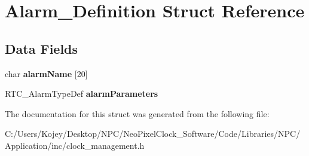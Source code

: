 \hypertarget{struct_alarm___definition}{}\section{Alarm\+\_\+\+Definition Struct Reference}
\label{struct_alarm___definition}
\subsection*{Data Fields}
\begin{DoxyCompactItemize}
\item 
\mbox{\label{struct_alarm___definition_a910598336cf85d4a06f702d78e22fe97}} 
char {\bfseries alarm\+Name} \mbox{[}20\mbox{]}
\item 
\mbox{\label{struct_alarm___definition_aec96eda8f1baa300f50a7ef3d8a9f342}} 
R\+T\+C\+\_\+\+Alarm\+Type\+Def {\bfseries alarm\+Parameters}
\end{DoxyCompactItemize}


The documentation for this struct was generated from the following file\+:\begin{DoxyCompactItemize}
\item 
C\+:/\+Users/\+Kojey/\+Desktop/\+N\+P\+C/\+Neo\+Pixel\+Clock\+\_\+\+Software/\+Code/\+Libraries/\+N\+P\+C/\+Application/inc/clock\+\_\+management.\+h\end{DoxyCompactItemize}
